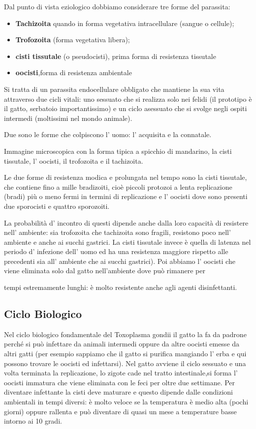   Dal punto di vista eziologico dobbiamo considerare tre forme del
  parassita:

\begin{itemize}
\item
  \textbf{Tachizoita} quando in forma vegetativa intracellulare (sangue
  o cellule);
\item
  \textbf{Trofozoita} (forma vegetativa libera);
\item
  \textbf{cisti tissutale} (o pseudocisti), prima forma di resistenza
  tissutale
\item
  \textbf{oocisti},forma di resistenza ambientale
\end{itemize}
  Si tratta di un parassita endocellulare obbligato che mantiene la sua
  vita attraverso due cicli vitali: uno sessuato che si realizza solo
  nei felidi (il prototipo è il gatto, serbatoio importantissimo) e un
  ciclo asessuato che si svolge negli ospiti intermedi (moltissimi nel
  mondo animale).

  Due sono le forme che colpiscono l' uomo: l' acquisita e la connatale.

  Immagine microscopica con la forma tipica a spicchio di mandarino, la
  cisti tissutale, l' oocisti, il trofozoita e il tachizoita.

  Le due forme di resistenza modica e prolungata nel tempo sono la cisti
  tissutale, che contiene fino a mille bradizoiti, cioè piccoli protozoi
  a lenta replicazione (bradi) più o meno fermi in termini di
  replicazione e l' oocisti dove sono presenti due sporocisti e quattro
  sporozoiti.

  La probabilità d' incontro di questi dipende anche dalla loro capacità
  di resistere nell' ambiente: sia trofozoita che tachizoita sono
  fragili, resistono poco nell' ambiente e anche ai succhi gastrici. La
  cisti tissutale invece è quella di latenza nel periodo d' infezione
  dell' uomo ed ha una resistenza maggiore rispetto alle precedenti sia
  all' ambiente che ai succhi gastrici). Poi abbiamo l' oocisti che
  viene eliminata solo dal gatto nell'ambiente dove può rimanere per

  tempi estremamente lunghi: è molto resistente anche agli agenti
  disinfettanti.

\subsection{Ciclo Biologico}

  Nel ciclo biologico fondamentale del Toxoplasma gondii il gatto la fa
  da padrone perché si può infettare da animali intermedi oppure da
  altre oocisti emesse da altri gatti (per esempio sappiamo che il gatto
  si purifica mangiando l' erba e qui possono trovare le oocisti ed
  infettarsi). Nel gatto avviene il ciclo sessuato e una volta terminata
  la replicazione, lo zigote cade nel tratto intestinale,si forma l'
  oocisti immatura che viene eliminata con le feci per oltre due
  settimane. Per diventare infettante la cisti deve maturare e questo
  dipende dalle condizioni ambientali in tempi diversi: è molto veloce
  se la temperatura è medio alta (pochi giorni) oppure rallenta e può
  diventare di quasi un mese a temperature basse intorno ai 10 gradi.

